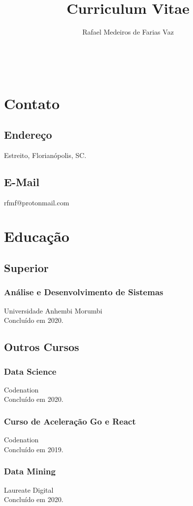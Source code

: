 \documentclass{article}
\renewcommand{\maketitle}{
\begin{center}
\begin{Huge}
\bfseries\theauthor \\
\end{Huge}
\end{center}
}
\begin{document}


\title{Curriculum Vitae}
\author{Rafael Medeiros de Farias Vaz}

\maketitle

\begin{multicols}{2}

\section{Contato}
  \subsection{Endere\c{c}o}
Estreito, Florianópolis, SC.
\subsection{E-Mail}
rfmf@protonmail.com

\section{Educa\c{c}\~ao}
\subsection{Superior}
\subsubsection{An\'alise e Desenvolvimento de Sistemas}
Universidade Anhembi Morumbi \\
Concluído em 2020.

\subsection{Outros Cursos}
\subsubsection{Data Science}
Codenation \\
Conclu\'ido em 2020.
\subsubsection{Curso de Acelera\c{c}\~ao Go e React}
Codenation \\
Conclu\'ido em 2019.
\subsubsection{Data Mining}
Laureate Digital \\
Conclu\'ido em 2020.

\end{multicols}
\end{document}
